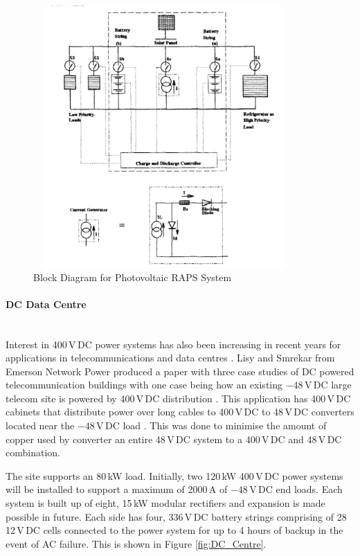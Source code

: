 \begin{figure}[H]
\hfill\includegraphics[width = 100mm, height = 100mm]{images/RAPS_Block}\hspace*{\fill}
\caption{{Block Diagram for Photovoltaic RAPS System \cite{Zahedi}}}
\label{fig:RAPS_Block}
\end{figure}        


\paragraph{DC Data Centre}
~\\
Interest in 400\,V\,DC power systems has also been increasing in recent years for applications in telecommunications and data centres \cite{Lisy2015}. Lisy and Smrekar from Emerson Network Power produced a paper with three case studies of DC powered telecommunication buildings with one case being how an existing $\num{-48}$\,V\,DC large telecom site is powered by 400\,V\,DC distribution \cite{Lisy2015}. This application has 400\,V\,DC cabinets that distribute power over long cables to 400\,V\,DC to 48\,V\,DC converters located near the $\num{-48}$\,V\,DC load \cite{Lisy2015}. This was done to minimise the amount of copper used by converter an entire 48\,V\,DC system to a 400\,V\,DC and 48\,V\,DC combination.
\newline

The site supports an 80\,kW load. Initially, two 120\,kW 400\,V\,DC power systems will be installed to support a maximum of 2000\,A of $\num{-48}$\,V\,DC end loads. Each system is built up of eight, 15\,kW modular rectifiers and expansion is made possible in future. Each side has four, 336\,V\,DC battery strings comprising of 28 12\,V\,DC cells connected to the power system for up to 4 hours of backup in the event of AC failure. This is shown in Figure \ref{fig:DC_Centre}. 

